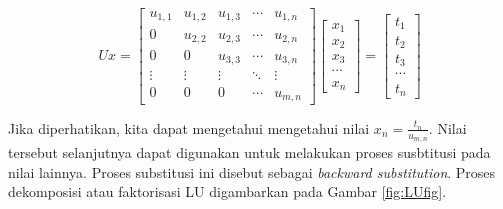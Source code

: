 \documentclass[
]{book}
\theoremstyle{definition}
\theoremstyle{definition}
\theoremstyle{definition}
\theoremstyle{definition}
\theoremstyle{remark}
\begin{document}
\begin{equation}
Ux=
\begin{bmatrix}
     u_{1,1} & u_{1,2} & u_{1,3} &\cdots& u_{1,n}           \\[0.3em]
     0       & u_{2,2} & u_{2,3} &\cdots& u_{2,n}           \\[0.3em]
     0       & 0       & u_{3,3} &\cdots& u_{3,n}           \\[0.3em]
     \vdots  & \vdots  & \vdots  &\ddots& \vdots            \\[0.3em]
     0       & 0      & 0        &\cdots& u_{m,n}
     \end{bmatrix}
\begin{bmatrix}
     x_1                                          \\[0.3em]
     x_2                                          \\[0.3em]
     x_3                                          \\[0.3em]
     \cdots                                       \\[0.3em]
     x_n                                       
     \end{bmatrix}
= \begin{bmatrix}
     t_1                                          \\[0.3em]
     t_2                                          \\[0.3em]
     t_3                                          \\[0.3em]
     \cdots                                       \\[0.3em]
     t_n                                       
     \end{bmatrix}
  \label{eq:LUdecomp7}
\end{equation}

Jika diperhatikan, kita dapat mengetahui mengetahui nilai \(x_n=\frac{t_n}{u_{m,n}}\). Nilai tersebut selanjutnya dapat digunakan untuk melakukan proses susbtitusi pada nilai lainnya. Proses substitusi ini disebut sebagai \emph{backward substitution}. Proses dekomposisi atau faktorisasi LU digambarkan pada Gambar \ref{fig:LUfig}.
\end{document}
